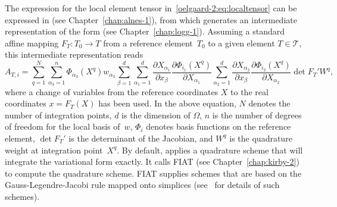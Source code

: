 The expression for the local element tensor
in~\eqref{oelgaard-2:eq:localtensor} can be expressed in \ufl{} (see
Chapter~\ref{chap:alnes-1}), from which \ffc{} generates an intermediate
representation of the form (see Chapter~\ref{chap:logg-1}).  Assuming a
standard affine mapping $F_T : T_0 \rightarrow T$ from a reference
element~$T_{0}$ to a given element $T \in \mathcal{T}$, this intermediate
representation reads
%
\begin{equation}
  A_{T,i}
  =
  \sum_{q=1}^{N}
%
  \sum_{\alpha_{3}=1}^n
  \Phi_{\alpha_{3}}(X^q)
  w_{\alpha_{3}}
%
  \sum_{\beta=1}^d
  \sum_{\alpha_1=1}^d
  \frac{\partial X_{\alpha_1}}{\partial x_{\beta}}
  \frac{\partial \Phi_{i_1}(X^q)}{\partial X_{\alpha_1}}
  \sum_{\alpha_2=1}^d
  \frac{\partial X_{\alpha_2}}{\partial x_{\beta}}
  \frac{\partial \Phi_{i_2}(X^q)}{\partial X_{\alpha_2}}
  \det F_T'
  W^q,
\label{oelgaard-2:eq:weightedlaplacian_quadraturerepresentation}
\end{equation}
%
where a change of variables from the reference coordinates $X$ to the real
coordinates $x = F_T(X)$ has been used. In the above equation, $N$ denotes
the number of integration points, $d$ is the dimension of $\Omega$,
$n$ is the number of degrees of freedom for the local basis of~$w$,
$\Phi_{i}$ denotes basis functions on the reference element, $\det F_T'$
is the determinant of the Jacobian, and $W^q$ is the quadrature weight
at integration point~$X^q$.  By default, \ffc{} applies a quadrature
scheme that will integrate the variational form exactly.  It calls FIAT
(see Chapter~\ref{chap:kirby-2}) to compute the quadrature scheme.
FIAT supplies schemes that are based on the Gauss-Legendre-Jacobi rule
mapped onto simplices (see~\citet{KarniadakisSherwin2005} for details
of such schemes).

